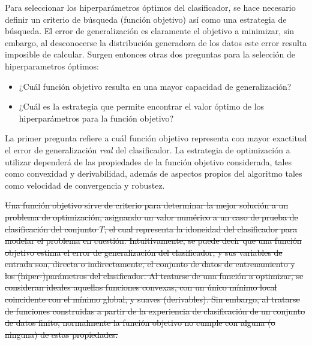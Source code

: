 \documentclass[12pt,bibliography=oldstyle,DIV=12,parskip=half-]{scrreprt}
\begin{document}
Para seleccionar los hiperparámetros óptimos del clasificador, se hace
necesario definir un criterio de búsqueda (función objetivo) así como
una estrategia de búsqueda.  El error de generalización es claramente
el objetivo a minimizar, sin embargo, al desconocerse la distribución
generadora de los datos este error resulta imposible de calcular.
Surgen entonces otras dos preguntas para la selección de
hiperparametros óptimos:
\begin{itemize}
\item ¿Cuál función objetivo resulta en una mayor capacidad de generalización?
\item ¿Cuál es la estrategia que permite encontrar el valor óptimo de
  los hiperparámetros para la función objetivo?
\end{itemize}
La primer pregunta refiere a cuál función objetivo representa con
mayor exactitud el error de generalización \emph{real} del
clasificador.  La estrategia de optimización a utilizar dependerá de
las propiedades de la función objetivo considerada, tales como
convexidad y derivabilidad, además de aspectos propios del algoritmo
tales como velocidad de convergencia y robustez.

\st{
Una función objetivo sirve de criterio para determinar la mejor
solución a un problema de optimización, asignando un valor numérico a
un caso de prueba de clasificación del conjunto $T$, el cual
representa la idoneidad del clasificador para modelar el problema en
cuestión. Intuitivamente, se puede decir que una función objetivo
estima el error de generalización del clasificador, y sus variables de
entrada son, directa o indirectamente, el conjunto de datos de
entrenamiento y los (hiper-)parámetros del clasificador.  Al tratarse
de una función a optimizar, se consideran ideales aquellas funciones
convexas, con un único mínimo local coincidente con el mínimo global,
y suaves (derivables). Sin embargo, al tratarse de funciones
construidas a partir de la experiencia de clasificación de un conjunto
de datos finito, normalmente la función objetivo no cumple con alguna
(o ninguna) de estas propiedades.
}


\end{document}
